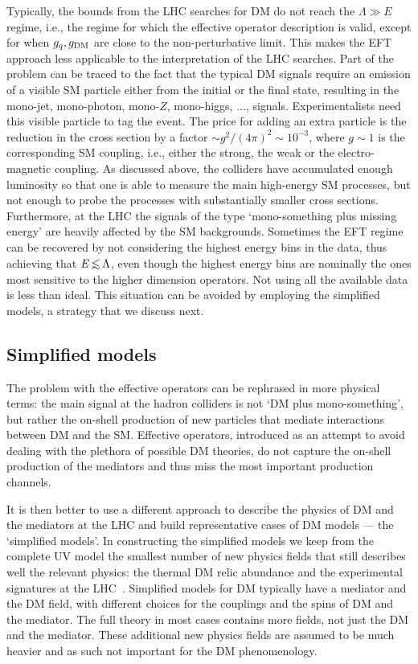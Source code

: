 Typically, the bounds from the LHC searches for DM do not reach the  $\Lambda \gg E$ regime, i.e., the regime for which 
the effective operator description is valid, except for when $g_q, g_{\rm DM}$ are close to the non-perturbative limit. This makes the EFT approach less applicable to the interpretation of the LHC searches.  
Part of the problem can be traced to the fact that the typical DM signals require an emission of 
a visible SM particle either from the initial or the final state, resulting in the mono-jet, mono-photon, mono-$Z$,
mono-higgs, ..., signals. 
Experimentalists need this visible particle to tag the event.  
The price for adding an extra particle is the reduction in the cross section by a factor
$\sim g^2/(4\pi)^2 \sim 10^{-3}$, where $g\sim 1$ is the corresponding SM coupling, i.e., either the strong, the weak or the electro-magnetic coupling.  As discussed above, the colliders have accumulated enough luminosity so that one is able to measure the main high-energy  SM processes,
but not enough to probe the processes with substantially smaller cross sections.
Furthermore, at the LHC the signals of the type `mono-something plus missing energy'  are heavily affected by the SM backgrounds.
Sometimes the EFT regime can be recovered by not considering the highest energy bins in the data, thus achieving that $E \circa{<} \Lambda$, even though the highest energy bins are nominally the ones most sensitive to the higher dimension operators. Not using all the available data is less than ideal.  This situation can be avoided by employing the simplified models, a strategy that we discuss next.  


\subsection{Simplified models}
The problem with the effective operators can be rephrased in more physical terms:
the main signal at the hadron colliders is not `DM plus mono-something',
but rather the on-shell production of new particles that mediate interactions between DM and the SM.
Effective operators, introduced as an attempt to avoid dealing with the plethora of possible DM theories, 
do not capture the on-shell production of the mediators and thus miss the most important production channels. 

 It is then better to use a different approach to describe the physics of DM and the mediators at the LHC and build representative cases of DM models --- the `simplified models'. In constructing the simplified models we keep from the complete UV model the smallest number of new physics fields that still describes well the relevant physics: the thermal DM relic abundance and the experimental signatures at the LHC~\cite{SimplifiedDMmodels,DM:simplified:models:reviews}. Simplified models for DM typically have a mediator and the DM field, with different choices for the couplings and the spins of DM and the mediator. The full theory in most cases contains more fields, not just the DM and the mediator. These additional new physics fields are assumed to be much heavier and as such not important for the DM phenomenology.  

